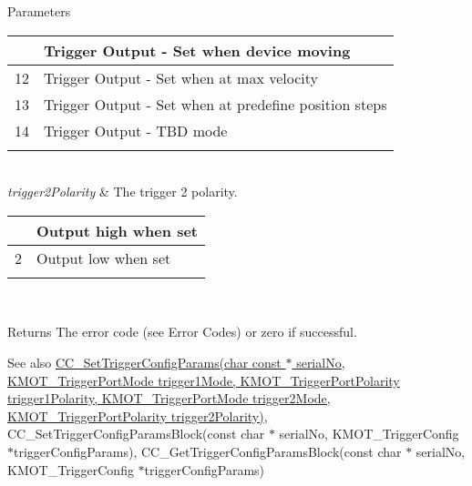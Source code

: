 \begin{DoxyParams}{Parameters}
\begin{tabularx}{\linewidth}{|*{2}{>{\raggedright\arraybackslash}X|}}
11&Trigger Output -\/ Set when device moving \\\cline{1-2}
12&Trigger Output -\/ Set when at max velocity \\\cline{1-2}
13&Trigger Output -\/ Set when at predefine position steps \\\cline{1-2}
14&Trigger Output -\/ T\+BD mode \\\cline{1-2}
\end{tabularx}
\\
\hline
{\em trigger2\+Polarity} & The trigger 2 polarity.\begin{tabularx}{\linewidth}{|*{2}{>{\raggedright\arraybackslash}X|}}\hline
1&Output high when set \\\cline{1-2}
2&Output low when set \\\cline{1-2}
\end{tabularx}
\\
\hline
\end{DoxyParams}
\begin{DoxyReturn}{Returns}
The error code (see Error Codes) or zero if successful. 
\end{DoxyReturn}
\begin{DoxySeeAlso}{See also}
\hyperlink{group___k_cube_d_c_servo_gab08e24eb7582b216f71ef91da2a67032}{C\+C\+\_\+\+Set\+Trigger\+Config\+Params(char const $\ast$ serial\+No, K\+M\+O\+T\+\_\+\+Trigger\+Port\+Mode trigger1\+Mode, K\+M\+O\+T\+\_\+\+Trigger\+Port\+Polarity trigger1\+Polarity, K\+M\+O\+T\+\_\+\+Trigger\+Port\+Mode trigger2\+Mode, K\+M\+O\+T\+\_\+\+Trigger\+Port\+Polarity trigger2\+Polarity)}, C\+C\+\_\+\+Set\+Trigger\+Config\+Params\+Block(const char $\ast$ serial\+No, K\+M\+O\+T\+\_\+\+Trigger\+Config $\ast$trigger\+Config\+Params), C\+C\+\_\+\+Get\+Trigger\+Config\+Params\+Block(const char $\ast$ serial\+No, K\+M\+O\+T\+\_\+\+Trigger\+Config $\ast$trigger\+Config\+Params)


\end{DoxySeeAlso}

